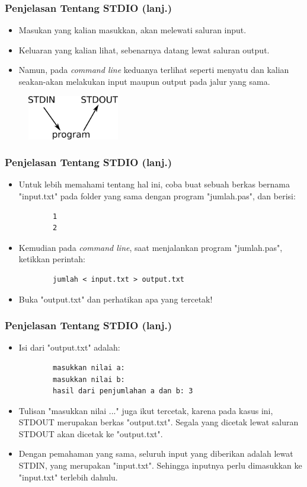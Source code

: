 \documentclass{beamer}
\begin{document}
\begin{frame}
\frametitle{Penjelasan Tentang STDIO (lanj.)}
\begin{itemize}
	\item Masukan yang kalian masukkan, akan melewati saluran input.
	\item Keluaran yang kalian lihat, sebenarnya datang lewat saluran output.
	\item Namun, pada \textit{command line} keduanya terlihat seperti menyatu dan kalian seakan-akan melakukan input maupun output pada jalur yang sama.
\end{itemize}
\begin{figure}
	\includegraphics[width=4cm]{asset/g1.png}
\end{figure}
\end{frame}

\begin{frame}[fragile]
\frametitle{Penjelasan Tentang STDIO (lanj.)}
\begin{itemize}
	\item Untuk lebih memahami tentang hal ini, coba buat sebuah berkas bernama "input.txt" pada folder yang sama dengan program "jumlah.pas", dan berisi:
	\begin{lstlisting}
		1
		2
	\end{lstlisting}
	\item Kemudian pada \textit{command line}, saat menjalankan program "jumlah.pas", ketikkan perintah:
	\begin{lstlisting}
		jumlah < input.txt > output.txt
	\end{lstlisting}
	\item Buka "output.txt" dan perhatikan apa yang tercetak!
\end{itemize}
\end{frame}

\begin{frame}[fragile]
\frametitle{Penjelasan Tentang STDIO (lanj.)}
\begin{itemize}
	\item Isi dari "output.txt" adalah:
	\begin{lstlisting}
		masukkan nilai a: 
		masukkan nilai b: 
		hasil dari penjumlahan a dan b: 3
	\end{lstlisting}
	\item Tulisan "masukkan nilai ..." juga ikut tercetak, karena pada kasus ini, STDOUT merupakan berkas "output.txt". Segala yang dicetak lewat saluran STDOUT akan dicetak ke "output.txt".
	\item Dengan pemahaman yang sama, seluruh input yang diberikan adalah lewat STDIN, yang merupakan "input.txt". Sehingga inputnya perlu dimasukkan ke "input.txt" terlebih dahulu.
\end{itemize}
\end{frame}
\end{document}
